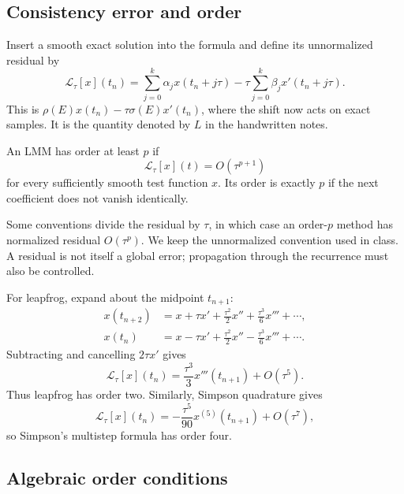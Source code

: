 \subsection{Consistency error and order}

Insert a smooth exact solution into the formula and define its
unnormalized residual by
\begin{equation}\label{eq:lmm-residual-oct-05}
 \mathcal L_\tau[x](t_n)
  =\sum_{j=0}^k\alpha_jx(t_n+j\tau)
       -\tau\sum_{j=0}^k\beta_jx'(t_n+j\tau).
\end{equation}
This is \(\rho(E)x(t_n)-\tau\sigma(E)x'(t_n)\), where the shift
now acts on exact samples. It is the quantity denoted by \(L\) in
the handwritten notes.

\begin{definition}
 An LMM has order at least \(p\) if
 \[
  \mathcal L_\tau[x](t)=O(\tau^{p+1})
 \]
 for every sufficiently smooth test function \(x\). Its order is
 exactly \(p\) if the next coefficient does not vanish identically.
\end{definition}

Some conventions divide the residual by \(\tau\), in which case
an order-\(p\) method has normalized residual \(O(\tau^p)\).
We keep the unnormalized convention used in class. A residual is
not itself a global error; propagation through the recurrence must
also be controlled.

For leapfrog, expand about the midpoint \(t_{n+1}\):
\begin{align*}
 x(t_{n+2})&=x+\tau x'+\frac{\tau^2}{2}x''
                         +\frac{\tau^3}{6}x'''+\cdots,\\
 x(t_n)&=x-\tau x'+\frac{\tau^2}{2}x''
                         -\frac{\tau^3}{6}x'''+\cdots.
\end{align*}
Subtracting and cancelling \(2\tau x'\) gives
\begin{equation}\label{eq:leapfrog-error-oct-05}
 \mathcal L_\tau[x](t_n)
   =\frac{\tau^3}{3}x'''(t_{n+1})+O(\tau^5).
\end{equation}
Thus leapfrog has order two. Similarly, Simpson quadrature gives
\begin{equation}\label{eq:simpson-error-oct-05}
 \mathcal L_\tau[x](t_n)
   =-\frac{\tau^5}{90}x^{(5)}(t_{n+1})+O(\tau^7),
\end{equation}
so Simpson's multistep formula has order four.

\subsection{Algebraic order conditions}

